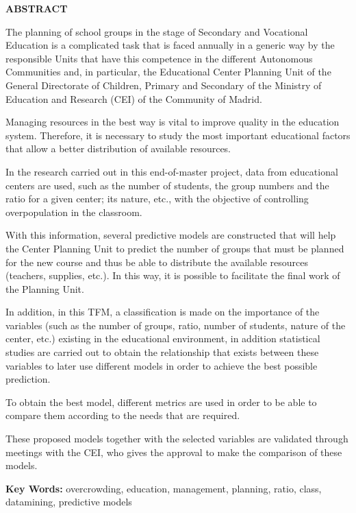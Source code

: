 \documentclass[spanish,12pt,a4paper,twoside,openright]{report}
\newcommand\blankpage{%
	\null
	\thispagestyle{empty}%
	\addtocounter{page}{-1}%
	\newpage}
\begin{document}
\blankpage

\begin{titlepage}
	
	\begin{flushright}
		{\large \bf ABSTRACT}
\\
\vspace{10pt}
\textit{}
{ 

	The planning of school groups in the stage of Secondary and Vocational Education is a complicated task that is faced annually in a generic way by the responsible Units that have this competence in the different Autonomous Communities and, in particular, the Educational Center Planning Unit of the General Directorate of Children, Primary and Secondary of the Ministry of Education and Research (CEI) of the Community of Madrid.
	
	Managing resources in the best way is vital to improve quality in the education system. Therefore, it is necessary to study the most important educational factors that allow a better distribution of available resources.
	
	In the research carried out in this end-of-master project, data from educational centers are used, such as the number of students, the group numbers and the ratio for a given center; its nature, etc., with the objective of controlling overpopulation in the classroom.
	
	With this information, several predictive models are constructed that will help the Center Planning Unit to predict the number of groups that must be planned for the new course and thus be able to distribute the available resources (teachers, supplies, etc.). In this way, it is possible to facilitate the final work of the Planning Unit.
	
	In addition, in this TFM, a classification is made on the importance of the variables (such as the number of groups, ratio, number of students, nature of the center, etc.) existing in the educational environment, in addition statistical studies are carried out to obtain the relationship that exists between these variables to later use different models in order to achieve the best possible prediction.
	
	To obtain the best model, different metrics are used in order to be able to compare them according to the needs that are required.
	
	These proposed models together with the selected variables are validated through meetings with the CEI, who gives the approval to make the comparison of these models.
	
} %
\end{flushright}
\textbf{Key Words: } overcrowding, education, management, planning, ratio, class, datamining, predictive models
\end{titlepage}
\blankpage
\end{document}
